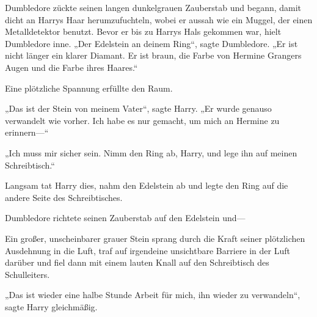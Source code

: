
Dumbledore zückte seinen langen dunkelgrauen Zauberstab und begann, damit dicht an Harrys Haar herumzufuchteln, wobei er aussah wie ein Muggel, der einen Metalldetektor benutzt. Bevor er bis zu Harrys Hals gekommen war, hielt Dumbledore inne. „Der Edelstein an deinem Ring“, sagte Dumbledore. „Er ist nicht länger ein klarer Diamant. Er ist braun, die Farbe von Hermine Grangers Augen und die Farbe ihres Haares.“

Eine plötzliche Spannung erfüllte den Raum.

„Das ist der Stein von meinem Vater“, sagte Harry. „Er wurde genauso verwandelt wie vorher. Ich habe es nur gemacht, um mich an Hermine zu erinnern—“

„Ich muss mir sicher sein. Nimm den Ring ab, Harry, und lege ihn auf meinen Schreibtisch.“

Langsam tat Harry dies, nahm den Edelstein ab und legte den Ring auf die andere Seite des Schreibtisches.

Dumbledore richtete seinen Zauberstab auf den Edelstein und—

Ein großer, unscheinbarer grauer Stein sprang durch die Kraft seiner plötzlichen Ausdehnung in die Luft, traf auf irgendeine unsichtbare Barriere in der Luft darüber und fiel dann mit einem lauten Knall auf den Schreibtisch des Schulleiters.

„Das ist wieder eine halbe Stunde Arbeit für mich, ihn wieder zu verwandeln“, sagte Harry gleichmäßig.


